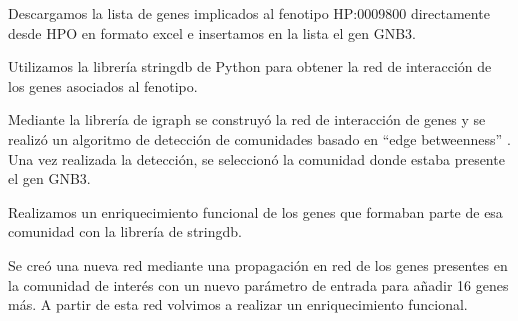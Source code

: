 Descargamos la lista de genes implicados al fenotipo HP:0009800 directamente desde HPO en formato excel e insertamos en la lista el gen GNB3.

Utilizamos la librería stringdb de Python para obtener la red de interacción de los genes asociados al fenotipo.

Mediante la librería de igraph se construyó la red de interacción de genes y se realizó un algoritmo de detección de comunidades basado en ``edge betweenness'' \cite{Girvan2002}. Una vez realizada la detección, se seleccionó la comunidad donde estaba presente el gen GNB3.

Realizamos un enriquecimiento funcional de los genes que formaban parte de esa comunidad con la librería de stringdb. 

Se creó una nueva red mediante una propagación en red de los genes presentes en la comunidad de interés con un nuevo parámetro de entrada para añadir 16 genes más. A partir de esta red volvimos a realizar un enriquecimiento funcional.
